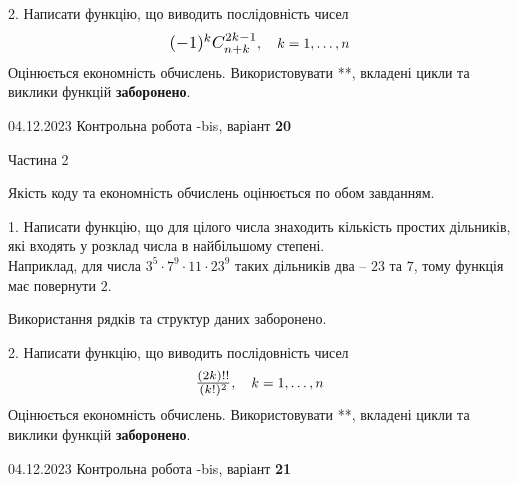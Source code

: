 \documentclass[12pt, ukrainian]{article}
\begin{document}
{{{{{{{{{{{{{{{{{{{\begin {Large}


2. 
Написати функцію, що виводить послідовність чисел
$$\scalebox{1.2}{$(-1)^{k}C_{n+k}^{2k-1}$}, \quad k=1,\ldots,n$$
Оцінюється економність обчислень. Використовувати **, вкладені цикли та виклики функцій \textbf{заборонено}.

\end{Large}\newpage




\begin {Huge}
{{04.12.2023 Контрольна робота -bis, варіант  \No \textbf { 20 }\par}}

\begin{center}Частина 2
\end{center}
\vspace{10mm}
\end {Huge}

{
\begin {Large}
Якість коду та економність обчислень оцінюється по обом завданням. 

\vspace{5mm}

1. Написати функцію, що для цілого числа знаходить кількість простих дільників, які входять у розклад числа в найбільшому степені. \\ Наприклад, для числа $3^5{\cdot}7^9{\cdot}11{\cdot}23^{9}$ таких дільників два – $23$ та $7$, тому функція має повернути $2$.

 Використання рядків та структур даних заборонено. 



\vspace{10mm}



2. 
Написати функцію, що виводить послідовність чисел
$$\scalebox{1.2}{$\frac{(2k)!!}{(k!)^2}$}, \quad k=1,\ldots,n$$
Оцінюється економність обчислень. Використовувати **, вкладені цикли та виклики функцій \textbf{заборонено}.

\end{Large}\newpage




\begin {Huge}
{{04.12.2023 Контрольна робота -bis, варіант  \No \textbf { 21 }\par}}


\end{Huge}}}}}}}}}}}}}}}}}}}}}
\end{document}
